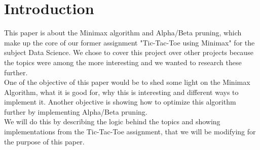 \section{Introduction}
\label{sec:introduction} %
This paper is about the Minimax algorithm and Alpha/Beta pruning, which make up the core of our former assignment 
"Tic-Tac-Toe using Minimax" for the subject Data Science. We chose to cover this project over other projects because 
the topics were among the more interesting and we wanted to research these further.
\\
One of the objective of this paper would be to shed some light on the Minimax Algorithm, 
what it is good for, why this is interesting and different ways to implement it.
Another objective is showing how to optimize this algorithm further by implementing Alpha/Beta pruning.    
\\
We will do this by describing the logic behind the topics and showing implementations from the Tic-Tac-Toe assignment,
that we will be modifying for the purpose of this paper.    
\clearpage